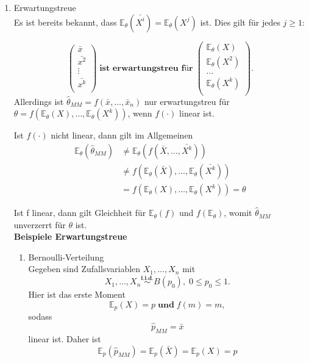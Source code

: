 \documentclass[10pt]{article}
\newcommand{\FZV}{X_1, \ldots, X_n} %
\newcommand{\EW}{\mathbb{E}} %
\begin{document}
\begin{enumerate}
	\item Erwartungstreue\\
	Es ist bereits bekannt, dass $\EW_\theta(\bar{X^i})=\EW_\theta(X^j)$ ist. Dies gilt für jedes $j \geq 1$:
	
	\begin{equation*}
		\left(
		\begin{array}{c}
			\bar{x}\\
			\bar{x^2}\\
			\vdots\\
			\bar{x^k}\\
		\end{array}
		\right)\; \textbf{ist erwartungstreu für} \;
		\left(
		\begin{array}{c}
		 \EW_\theta(X)\\
		 \EW_\theta(X^2)\\
			\dots\\
		 \EW_\theta(X^k) \\
		\end{array}
		\right).
	\end{equation*}
	 Allerdings ist $\hat{\theta}_{MM} = f(\bar{x}, \ldots, \bar{x}_n)$ nur erwartungstreu für $\theta = f(\EW_\theta(X), \ldots, \EW_\theta(X^k))$, wenn $f(\cdot)$ linear ist. 
	 
	 Ist $f(\cdot)$ nicht linear, dann gilt im Allgemeinen
	 \begin{equation*}
	 	\begin{split}
	 	\EW_\theta(\hat{\theta}_{MM}) &\neq \EW_\theta(f(\bar{X}, \ldots, \bar{X^k}))\\
	 	&\neq f(\EW_\theta(\bar{X}),\ldots, \EW_\theta(\bar{X^k}))\\
	 	&= f(\EW_\theta({X}),\ldots, \EW_\theta({X^k})) =  \theta
	 \end{split}
	 \end{equation*}
	
	Ist f linear, dann gilt Gleichheit für $\EW_{\theta}(f)$ und $f(\EW_{\theta})$, womit $\hat{\theta}_{MM}$ unverzerrt für $\theta$ ist.\\
	
	\textbf{Beispiele Erwartungstreue}

	\begin{enumerate}[label = (\roman*)]
		\item Bernoulli-Verteilung\\
			Gegeben sind Zufallsvariablen $\FZV$ mit
		\begin{equation*}
			\FZV \overset{\textbf{i.i.d.}}{\sim} B(p_0), \; 0 \leq p_0 \leq 1.
		\end{equation*} 
		Hier ist das erste Moment
		\begin{equation*}
			\EW_p(X)=p \; \textbf{und} \; 	f(m)=m,
		\end{equation*}
		sodass
		\begin{equation*}
			\hat{p}_{MM} = \bar{x} 
		\end{equation*}
		linear ist. Daher ist 
		\begin{equation*}
			\EW_p(\hat{p}_{MM}) = \EW_p(\bar{X}) = \EW_p(X) = p
		\end{equation*}
		

\end{enumerate}
\end{enumerate}
\end{document}
